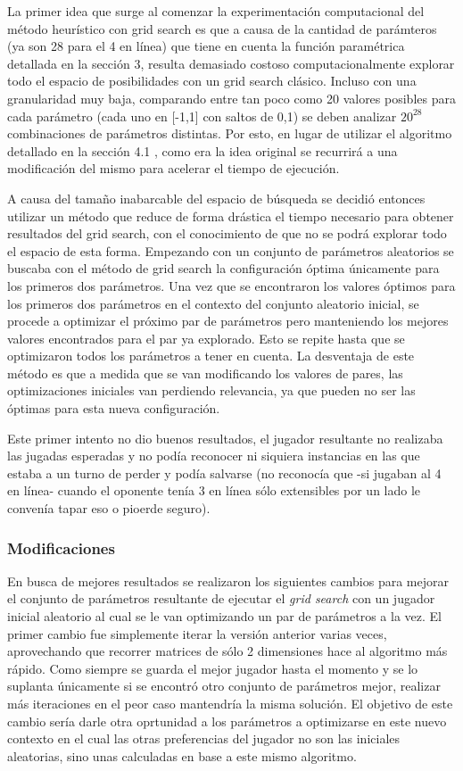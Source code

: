 \documentclass[A4paper,oneside,fleqn,11pt]{article}
\theoremstyle{definition}
\begin{document}
La primer idea que surge al comenzar la experimentación computacional del método heurístico con grid search es que a causa de la cantidad de parámteros (ya son 28 para el 4 en línea) que tiene en cuenta la función paramétrica detallada en la sección 3, resulta demasiado costoso computacionalmente explorar todo el espacio de posibilidades con un grid search clásico. Incluso  con una granularidad muy baja, comparando entre tan poco como 20 valores posibles para cada parámetro (cada uno en [-1,1] con saltos de 0,1) se deben analizar $ 20^{28}$ combinaciones de parámetros distintas. Por esto, en lugar de utilizar el algoritmo detallado en la sección 4.1 , como era la idea original se recurrirá a una modificación del mismo para acelerar el tiempo de ejecución.

A causa del tamaño inabarcable del espacio de búsqueda se decidió entonces utilizar un método que reduce de forma drástica el tiempo necesario para obtener resultados del grid search, con el conocimiento de que no se podrá explorar todo el espacio de esta forma. Empezando con un conjunto de parámetros aleatorios se buscaba con el método de grid search la configuración óptima únicamente para los primeros dos parámetros. Una vez que se encontraron los valores óptimos para los primeros dos parámetros en el contexto del conjunto aleatorio inicial, se procede a optimizar el próximo par de parámetros pero manteniendo los mejores valores encontrados para el par ya explorado. Esto se repite hasta que se optimizaron todos los parámetros a tener en cuenta. La desventaja de este método es que a medida que se van modificando los valores de pares, las optimizaciones iniciales van perdiendo relevancia, ya que pueden no ser las óptimas para esta nueva configuración.

Este primer intento no dio buenos resultados, el jugador resultante no realizaba las jugadas esperadas y no podía reconocer ni siquiera instancias en las que estaba a un turno de perder y podía salvarse (no reconocía que -si jugaban al 4 en línea- cuando el oponente tenía 3 en línea sólo extensibles por un lado le convenía tapar eso o pioerde seguro).


\subsubsection{Modificaciones}

En busca de mejores resultados se realizaron los siguientes cambios para mejorar el conjunto de parámetros resultante de ejecutar el \textit{grid search} con un jugador inicial aleatorio al cual se le van optimizando un par de parámetros a la vez. El primer cambio fue simplemente iterar la versión anterior varias veces, aprovechando que recorrer matrices de sólo 2 dimensiones hace al algoritmo más rápido. Como siempre se guarda el mejor jugador hasta el momento y se lo suplanta únicamente si se encontró otro conjunto de parámetros mejor, realizar más iteraciones en el peor caso mantendría la misma solución. El objetivo de este cambio sería darle otra oprtunidad a los parámetros a optimizarse en este nuevo contexto en el cual las otras preferencias del jugador no son las iniciales aleatorias, sino unas calculadas en base a este mismo algoritmo. 
\end{document}
